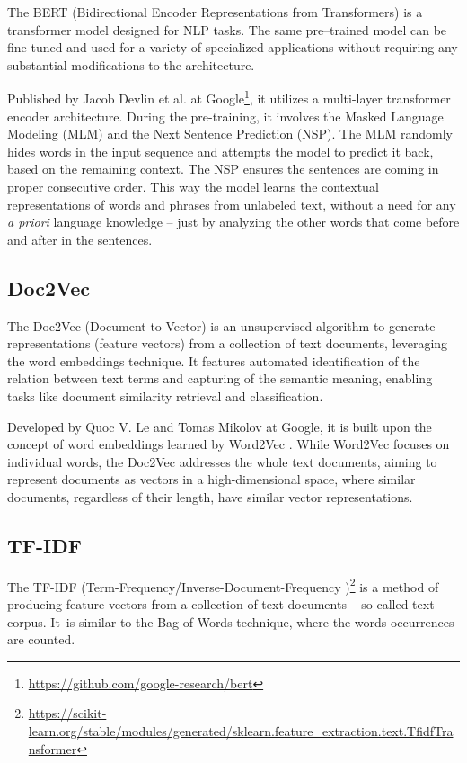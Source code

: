 The BERT (Bidirectional Encoder Representations from Transformers) is a transformer model designed for NLP tasks. The same pre–trained model can be fine-tuned and used for a variety of specialized applications without requiring any substantial modifications to the architecture.

Published by Jacob Devlin et al. \cite{Devlin-2019} at Google\footnote{\url{https://github.com/google-research/bert}}, it utilizes a multi-layer transformer encoder architecture. During the pre-training, it involves the Masked Language Modeling (MLM) and the Next Sentence Prediction (NSP). The MLM randomly hides words in the input sequence and attempts the model to predict it back, based on the remaining context. The NSP ensures the sentences are coming in proper consecutive order. This way the model learns the contextual representations of words and phrases from unlabeled text, without a need for any \textit{a priori} language knowledge – just by analyzing the other words that come before and after in the sentences.


\subsection{Doc2Vec}
\label{section:Doc2Vec}

The Doc2Vec (Document to Vector) is an unsupervised algorithm to generate representations (feature vectors) from a collection of text documents, leveraging the word embeddings technique. It features automated identification of the relation between text terms and capturing of the semantic meaning, enabling tasks like document similarity retrieval and classification.

Developed by Quoc V. Le and Tomas Mikolov \cite{Le-2014} at Google, it is built upon the concept of word embeddings learned by Word2Vec \cite{Mikolov-2013}. While Word2Vec focuses on individual words, the Doc2Vec addresses the whole text documents, aiming to represent documents as vectors in a high-dimensional space, where similar documents, regardless of their length, have similar vector representations.


\subsection{TF-IDF}
\label{section:TF-IDF}

The TF-IDF (Term-Frequency/Inverse-Document-Frequency \cite{Lang-1995})\footnote{\scriptsize\url{https://scikit-learn.org/stable/modules/generated/sklearn.feature_extraction.text.TfidfTransformer}} is a method of producing feature vectors from a collection of text documents – so called text corpus. It~is similar to the Bag-of-Words technique, where the words occurrences are counted.

